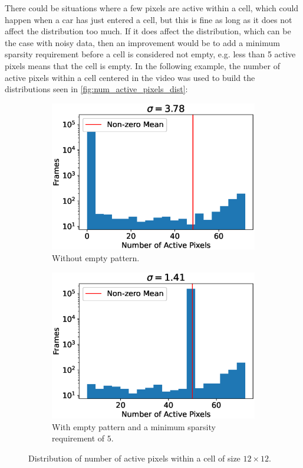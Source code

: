 There could be situations where a few pixels are active within a cell, which could happen when a car has just entered a cell, but this is fine as long as it does not affect the distribution too much. If it does affect the distribution, which can be the case with noisy data, then an improvement would be to add a minimum sparsity requirement before a cell is considered not empty, e.g. less than 5 active pixels means that the cell is empty.  In the following example, the number of active pixels within a cell centered in the video was used to build the distributions seen in \autoref{fig:num_active_pixels_dist}:
\begin{figure}[H]
    \centering
    \begin{subfigure}[t]{0.49\textwidth}
        \centering
        \includegraphics[width=\textwidth]{resources/methodology/active_pixels_dist.eps}
        \caption{Without empty pattern.}
    \end{subfigure}%
    \begin{subfigure}[t]{0.49\textwidth}
        \centering
        \includegraphics[width=\textwidth]{resources/methodology/active_pixels_dist2.eps}
        \caption{With empty pattern and a minimum sparsity requirement of $5$.}
    \end{subfigure}
    \caption[Distribution of Active Pixels]{Distribution of number of active pixels within a cell of size $12\times 12$.}
    \label{fig:num_active_pixels_dist}
\end{figure}



